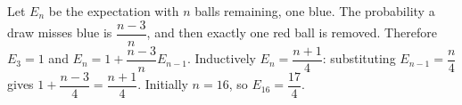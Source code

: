 Let $E_n$ be the expectation with $n$ balls remaining, one blue. The probability a draw misses blue is $\dfrac{n-3}{n}$, and then exactly one red ball is removed. Therefore $E_3=1$ and $E_n=1+\dfrac{n-3}{n}E_{n-1}$. Inductively $E_n=\dfrac{n+1}{4}$: substituting $E_{n-1}=\dfrac{n}{4}$ gives $1+\dfrac{n-3}{4}=\dfrac{n+1}{4}$. Initially $n=16$, so $\boxed{E_{16}=\dfrac{17}{4}}$.
